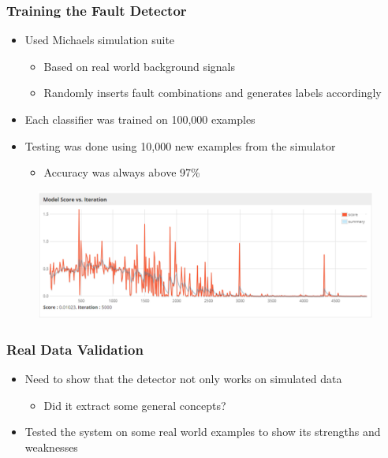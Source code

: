 \begin{frame}
  \frametitle{Training the Fault Detector}
  \begin{itemize}
    \item Used Michaels simulation suite
      \begin{itemize}
        \item Based on real world background signals
        \item Randomly inserts fault combinations and generates labels
          accordingly
      \end{itemize}
    \item Each classifier was trained on 100,000 examples
    \item Testing was done using 10,000 new examples from the
      simulator
      \begin{itemize}
        \item Accuracy was always above 97\%
      \end{itemize}
  \end{itemize}
  \begin{figure}
    \includegraphics[width=.85\textwidth]{../figures/learning_curve}
  \end{figure}
\end{frame}

\begin{frame}
  \frametitle{Real Data Validation}
  \begin{itemize}
    \item Need to show that the detector not only works on simulated
      data
      \begin{itemize}
        \item Did it extract some general concepts?
      \end{itemize}
    \item Tested the system on some real world examples to show its
      strengths and weaknesses
  \end{itemize}
\end{frame}

